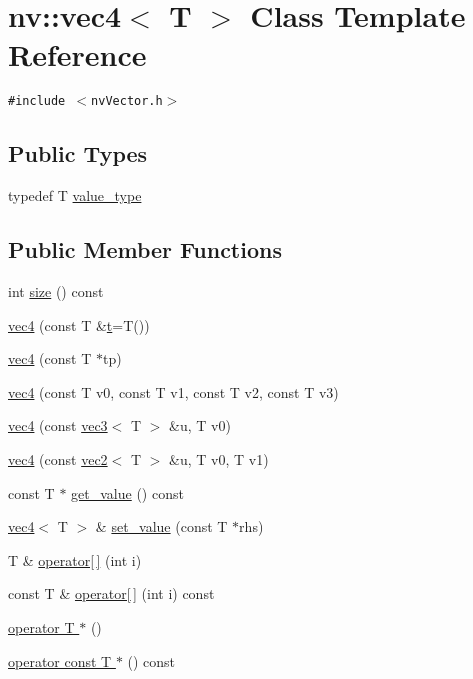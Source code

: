 \hypertarget{classnv_1_1vec4}{
\section{nv::vec4$<$ T $>$ Class Template Reference}
\label{classnv_1_1vec4}
}
{\tt \#include $<$nvVector.h$>$}

\subsection*{Public Types}
\begin{CompactItemize}
\item 
typedef T \hyperlink{classnv_1_1vec4_09fb8b95c9c02056c65620ea2fba281b}{value\_\-type}
\end{CompactItemize}
\subsection*{Public Member Functions}
\begin{CompactItemize}
\item 
int \hyperlink{classnv_1_1vec4_156fc0ecb56f75f2527c566c8006242c}{size} () const 
\item 
\hyperlink{classnv_1_1vec4_0470436181d9e8f169f71bba61e5f4ee}{vec4} (const T \&\hyperlink{classnv_1_1vec4_89a4682a6fae5210e042020eae36c6a1}{t}=T())
\item 
\hyperlink{classnv_1_1vec4_49189b4f132699a853a585e7abd3d4a4}{vec4} (const T $\ast$tp)
\item 
\hyperlink{classnv_1_1vec4_2ba35eefe81119c372be34475d33a49c}{vec4} (const T v0, const T v1, const T v2, const T v3)
\item 
\hyperlink{classnv_1_1vec4_aa0de52ffe83b44710ded7a797f978f6}{vec4} (const \hyperlink{classnv_1_1vec3}{vec3}$<$ T $>$ \&u, T v0)
\item 
\hyperlink{classnv_1_1vec4_b62d37042a2dcf73249ac20464b64d84}{vec4} (const \hyperlink{classnv_1_1vec2}{vec2}$<$ T $>$ \&u, T v0, T v1)
\item 
const T $\ast$ \hyperlink{classnv_1_1vec4_4bc644b550faad02d634cc5677309730}{get\_\-value} () const 
\item 
\hyperlink{classnv_1_1vec4}{vec4}$<$ T $>$ \& \hyperlink{classnv_1_1vec4_3ff55b6469beb2b7ac4abb389cc91921}{set\_\-value} (const T $\ast$rhs)
\item 
T \& \hyperlink{classnv_1_1vec4_dab48546512b2c5a4f359061441fa661}{operator\mbox{[}$\,$\mbox{]}} (int i)
\item 
const T \& \hyperlink{classnv_1_1vec4_36ba5d7380e6d8c87c12f7b5b60add54}{operator\mbox{[}$\,$\mbox{]}} (int i) const 
\item 
\hyperlink{classnv_1_1vec4_06247a6ebeac641b86f522f4ba13e425}{operator T $\ast$} ()
\item 
\hyperlink{classnv_1_1vec4_084885a396bb36727440eed8ba536270}{operator const T $\ast$} () const 
\end{CompactItemize}
